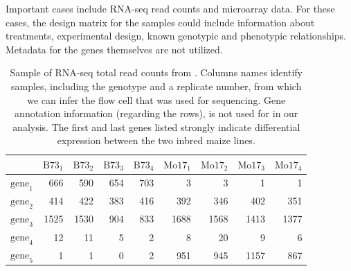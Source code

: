 Important cases include RNA-seq read counts and microarray data. For these cases, the design matrix for the samples could include information about treatments, experimental design, known genotypic and phenotypic relationships. Metadata for the genes themselves are not utilized.


\begin{table}[ht]
\centering
\caption{\small Sample of RNA-seq total read counts from \citep{paschold}. Columns names identify samples, including the genotype and a replicate number, from which we can infer the flow cell that was used for sequencing. Gene annotation information (regarding the rows), is not used for in our analysis. The first and last genes listed strongly indicate differential expression between the two inbred maize lines.}
\label{tab:data}
\vspace{.25cm}
\begin{tabular}{lrrrrrrrr}
  \hline
& $\mbox{B73}_1$ & $\mbox{B73}_2$ & $\mbox{B73}_3$ & $\mbox{B73}_4$ & $\mbox{Mo17}_1$ & $\mbox{Mo17}_2$ & $\mbox{Mo17}_3$ & $\mbox{Mo17}_4$ \\ 
  \hline
$\mbox{gene}_1$ & 666 & 590 & 654 & 703 &   3 &   3 &   1 &   1 \\ 
$\mbox{gene}_2$& 414 & 422 & 383 & 416 & 392 & 346 & 402 & 351 \\ 
  $\mbox{gene}_3$ & 1525 & 1530 & 904 & 833 & 1688 & 1568 & 1413 & 1377 \\ 
  $\mbox{gene}_4$ &  12 &  11 &   5 &   2 &   8 &  20 &   9 &   6 \\ 
  $\mbox{gene}_5$ &   1 &   1 &   0 &   2 & 951 & 945 & 1157 & 867 \\ 
   \hline
\end{tabular}
\end{table}
